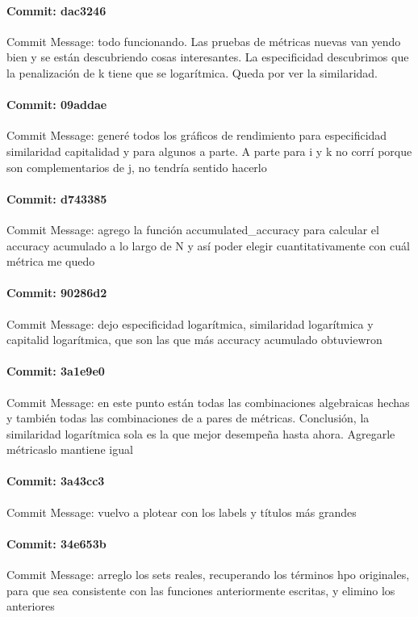 \documentclass{article}
\begin{document}
\paragraph{Commit: dac3246}
Commit Message: todo funcionando. Las pruebas de métricas nuevas van yendo bien y se están descubriendo cosas interesantes. La especificidad descubrimos que la penalización de k tiene que se logarítmica. Queda por ver la similaridad.

\paragraph{Commit: 09addae}
Commit Message: generé todos los gráficos de rendimiento para especificidad similaridad capitalidad y para algunos a parte. A parte para i y k no corrí porque son complementarios de j, no tendría sentido hacerlo

\paragraph{Commit: d743385}
Commit Message: agrego la función accumulated_accuracy para calcular el accuracy acumulado a lo largo de N y así poder elegir cuantitativamente con cuál métrica me quedo

\paragraph{Commit: 90286d2}
Commit Message: dejo especificidad logarítmica, similaridad logarítmica y capitalid logarítmica, que son las que más accuracy acumulado obtuviewron

\paragraph{Commit: 3a1e9e0}
Commit Message: en este punto están todas las combinaciones algebraicas hechas y también todas las combinaciones de a pares de métricas. Conclusión, la similaridad logarítmica sola es la que mejor desempeña hasta ahora. Agregarle métricaslo mantiene igual

\paragraph{Commit: 3a43cc3}
Commit Message: vuelvo a plotear con los labels y títulos más grandes

\paragraph{Commit: 34e653b}
Commit Message: arreglo los sets reales, recuperando los términos hpo originales, para que sea consistente con las funciones anteriormente escritas, y elimino los anteriores
\end{document}
